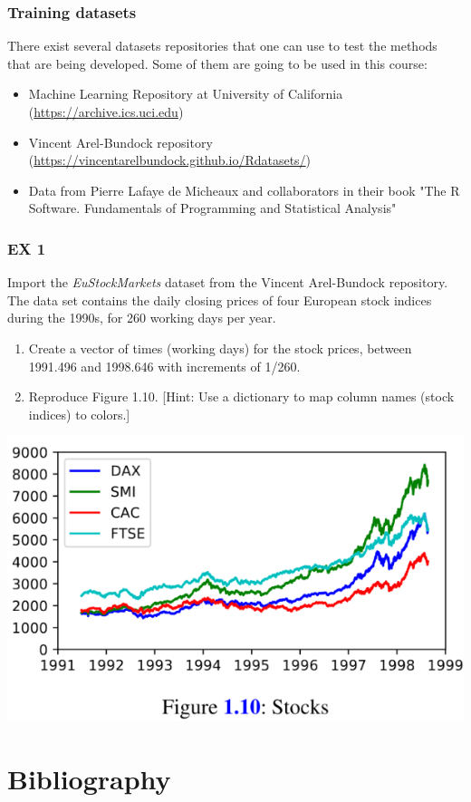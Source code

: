 \documentclass{beamer}
\begin{document}
\begin{frame}
\frametitle{Training datasets}
There exist several datasets repositories that one can use to test the methods that are being developed. Some of them are going to be used in this course:
\begin{itemize}
\item Machine Learning Repository at University of California (\url{https://archive.ics.uci.edu})
\item Vincent Arel-Bundock repository (\url{https://vincentarelbundock.github.io/Rdatasets/})
\item Data from Pierre Lafaye de Micheaux and collaborators in their book  "The R Software. Fundamentals of Programming and Statistical Analysis" \cite{lafaye_de_micheaux_r_2013}
\end{itemize}
\end{frame}


\begin{frame}[allowframebreaks]
  \frametitle{EX 1}
  \begin{Exercise}[title={Data visualization}]
    Import the {\em EuStockMarkets} dataset from the Vincent Arel-Bundock repository. The data set contains the daily closing prices of four European stock indices during the
    1990s, for 260 working days per year.
    \begin{enumerate}
      \item Create a vector of times (working days) for the stock prices, between 1991.496 and 1998.646 with increments of 1/260.
      \item Reproduce Figure 1.10. [Hint: Use a dictionary to map column names (stock indices) to colors.]
     \end{enumerate}
     \includegraphics[width=0.9\linewidth]{stocks}
  \end{Exercise}
\end{frame}


\section{Bibliography}


\end{document}
